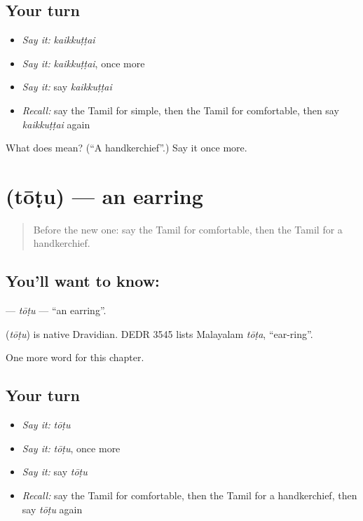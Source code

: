 \subsection*{Your turn}
\begin{itemize}
\raggedright
  \item \emph{Say it:} \emph{kaikkuṭṭai}
  \item \emph{Say it:} \emph{kaikkuṭṭai}, once more
  \item \emph{Say it:} say \emph{kaikkuṭṭai}
  \item \emph{Recall:} say the Tamil for simple, then the Tamil for comfortable, then say \emph{kaikkuṭṭai} again
\end{itemize}

\begin{tcolorbox}[breakable,colback=teal!4,colframe=teal!35!black,title={Before you move on}]
What does  mean? (\textquotedblleft{}A handkerchief\textquotedblright{}.) Say it once more.
\end{tcolorbox}
\section[\texorpdfstring{\ta{தோடு} (tōṭu)}{தோடு (tōṭu)}]{ (tōṭu) — an earring}

\label{lesson:TA-C270-totu2}



\begin{quote}
Before the new one: say the Tamil for comfortable, then the Tamil for a handkerchief.
\end{quote}

\subsection*{You'll want to know: }
\textbf{} — \emph{tōṭu} — \textquotedblleft{}an earring\textquotedblright{}.

\begin{cousinweb}
\textbf{} (\emph{tōṭu}) is native Dravidian. DEDR 3545 lists Malayalam \emph{tōṭa}, \textquotedblleft{}ear-ring\textquotedblright{}.
\end{cousinweb}

\begin{grammarlens}[title={What you've built}]
One more word for this chapter.
\end{grammarlens}

\subsection*{Your turn}
\begin{itemize}
\raggedright
  \item \emph{Say it:} \emph{tōṭu}
  \item \emph{Say it:} \emph{tōṭu}, once more
  \item \emph{Say it:} say \emph{tōṭu}
  \item \emph{Recall:} say the Tamil for comfortable, then the Tamil for a handkerchief, then say \emph{tōṭu} again
\end{itemize}

